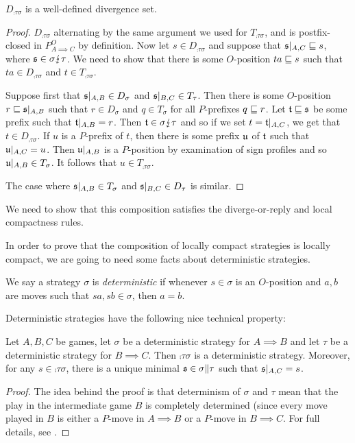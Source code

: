 \documentclass{entcs} \usepackage{prentcsmacro}
\newcommand{\dv}{{\lightning}}
\newcommand{\0}{{\mathtt{0}}}
\begin{document}
\begin{proposition}
  $D_{\comp\tau\sigma}$ is a well-defined divergence set.
\end{proposition}
  \begin{proof}
    $D_{\comp\tau\sigma}$ alternating by the same argument we used for $T_{\comp\tau\sigma}$, and is postfix-closed in $P_{A\implies C}^O$ by definition.  Now let $s\in D_{\comp\tau\sigma}$ and suppose that $\mathfrak s\vert_{A,C}\sqsubseteq s$, where $\s\in \sigma\dv\tau$.  We need to show that there is some $O$-position $ta\sqsubseteq s$ such that $ta\in D_{\comp\tau\sigma}$ and $t\in T_{\comp\tau\sigma}$.

    Suppose first that $\mathfrak s\vert_{A,B}\in D_\sigma$ and $\mathfrak s\vert_{B,C}\in T_\tau$.  Then there is some $O$-position $r\sqsubseteq \mathfrak s\vert_{A,B}$ such that $r\in D_\sigma$ and $q\in T_\sigma$ for all $P$-prefixes $q\sqsubseteq r$.  Let $\mathfrak t\sqsubseteq\mathfrak s$ be some prefix such that $\mathfrak t\vert_{A,B}=r$.  Then $\t\in\sigma\dv\tau$ and so if we set $t=\mathfrak t\vert_{A,C}$, we get that $t\in D_{\comp\tau\sigma}$.  If $u$ is a $P$-prefix of $t$, then there is some prefix $\mathfrak u$ of $\mathfrak t$ such that $\mathfrak u\vert_{A,C}=u$.  Then $\mathfrak u\vert_{A,B}$ is a $P$-position by examination of sign profiles and so $\mathfrak u\vert_{A,B}\in T_\sigma$.  It follows that $u\in T_{\comp\tau\sigma}$.  

    The case where $\mathfrak s\vert_{A,B}\in T_\sigma$ and $\mathfrak s\vert_{B,C}\in D_\tau$ is similar.
  \end{proof}

We need to show that this composition satisfies the diverge-or-reply and local compactness rules.  

In order to prove that the composition of locally compact strategies is locally compact, we are going to need some facts about deterministic strategies.

\begin{definition}
  We say a strategy $\sigma$ is \emph{deterministic} if whenever $s\in\sigma$ is an $O$-position and $a,b$ are moves such that $sa,sb\in\sigma$, then $a=b$.
\end{definition}

Deterministic strategies have the following nice technical property:

\begin{proposition}
  Let $A,B,C$ be games, let $\sigma$ be a deterministic strategy for $A\implies B$ and let $\tau$ be a deterministic strategy for $B\implies C$.  Then $\comp\tau\sigma$ is a deterministic strategy.  Moreover, for any $s\in\comp\tau\sigma$, there is a unique minimal $\mathfrak s\in\sigma\|\tau$ such that $\mathfrak s\vert_{A,C}=s$.
\end{proposition}
  \begin{proof}
    The idea behind the proof is that determinism of $\sigma$ and $\tau$ mean that the play in the intermediate game $B$ is completely determined (since every move played in $B$ is either a $P$-move in $A\implies B$ or a $P$-move in $B\implies C$.  For full details, see \cite{abramskyjagadeesangames}.
  \end{proof}
\end{document}

